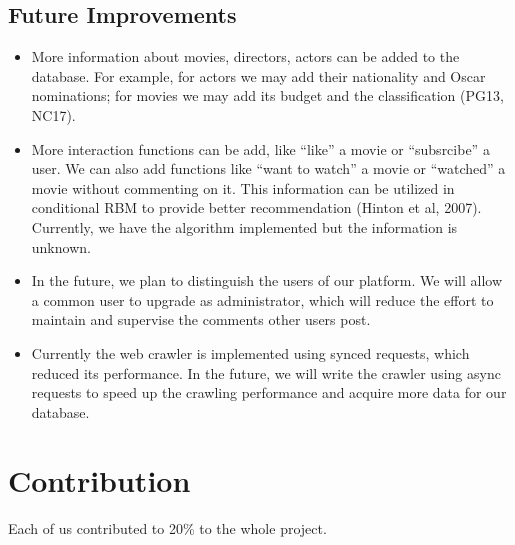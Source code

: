 \begin{CJK*}{UTF8}{gbsn}
\subsection{Future Improvements}
\begin{itemize}
\item More information about movies, directors, actors can be added to the database. For example, for actors we may add their nationality and Oscar nominations; for movies we may add its budget and the classification (PG13, NC17).
\item More interaction functions can be add, like ``like'' a movie or ``subsrcibe'' a user. We can also add functions like ``want to watch'' a movie or ``watched'' a movie without commenting on it. This information can be utilized in conditional RBM to provide better recommendation (Hinton et al, 2007). Currently, we have the algorithm implemented but the information is unknown. 
\item In the future, we plan to distinguish the users of our platform. We will allow a common user to upgrade as administrator, which will reduce the effort to maintain and supervise the comments other users post.
\item Currently the web crawler is implemented using synced requests, which reduced its performance. In the future, we will write the crawler using async requests to speed up the crawling performance and acquire more data for our database.
\end{itemize}

\section{Contribution}
Each of us contributed to 20\% to the whole project.







\end{CJK*}

